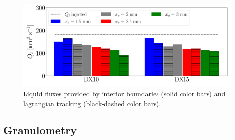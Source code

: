 


\begin{figure}[ht]
	\centering
   \includegraphics[scale=0.25]{./part3_applications/figures_ch8_resolved/SPRAY_characterization/establishment_and_fluxes/fluxes_SLI_vs_IBs}
   \caption{Liquid fluxes provided by interior boundaries (solid color bars) and lagrangian tracking (black-dashed color bars).}
   \label{fig:ch8_fluxes_bargraph_IBs_vs_LGS}
\end{figure}


\subsection{Granulometry}
\label{ch8:subsec_spray_char_granulo}

